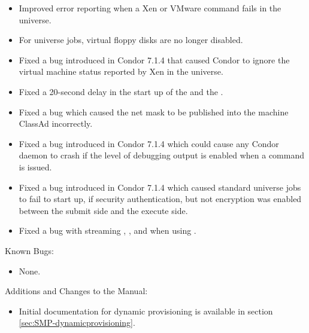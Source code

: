 \begin{itemize}
\item Improved error reporting when a Xen or VMware command fails in the
 universe.

\item For  universe jobs,
virtual floppy disks are no longer disabled.

\item Fixed a bug introduced in Condor 7.1.4 that caused Condor to
ignore the virtual machine status reported by Xen in the  universe.

\item Fixed a 20-second delay in the start up of the  and
the .

\item Fixed a bug which caused the net mask to be published
  into the machine ClassAd incorrectly.

\item Fixed a bug introduced in Condor 7.1.4 which could cause any
  Condor daemon to crash if the level of debugging output 
  is enabled when a  command is issued.

\item Fixed a bug introduced in Condor 7.1.4 which caused standard universe
jobs to fail to start up, if security authentication, but not encryption was
enabled between the submit side and the execute side.


\item Fixed a bug with streaming , , and
 when using .


\end{itemize}

\noindent Known Bugs:

\begin{itemize}

\item None.

\end{itemize}

\noindent Additions and Changes to the Manual:

\begin{itemize}

\item Initial documentation for dynamic provisioning is available
in section~ \ref{sec:SMP-dynamicprovisioning}.

\end{itemize}

